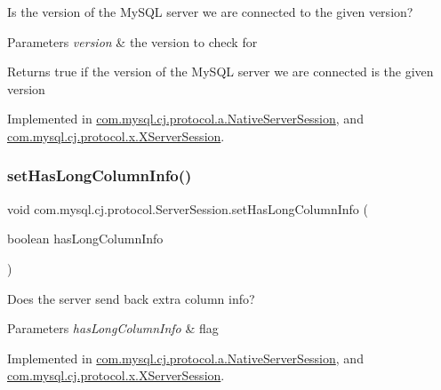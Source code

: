 Is the version of the My\+S\+QL server we are connected to the given version?


\begin{DoxyParams}{Parameters}
{\em version} & the version to check for\\
\hline
\end{DoxyParams}
\begin{DoxyReturn}{Returns}
true if the version of the My\+S\+QL server we are connected is the given version 
\end{DoxyReturn}


Implemented in \mbox{\hyperlink{classcom_1_1mysql_1_1cj_1_1protocol_1_1a_1_1_native_server_session_a07301eeaa6402981ce961f528b4e09ef}{com.\+mysql.\+cj.\+protocol.\+a.\+Native\+Server\+Session}}, and \mbox{\hyperlink{classcom_1_1mysql_1_1cj_1_1protocol_1_1x_1_1_x_server_session_aa121370ff7a1579fd5d7f4d653594f49}{com.\+mysql.\+cj.\+protocol.\+x.\+X\+Server\+Session}}.

\mbox{\label{interfacecom_1_1mysql_1_1cj_1_1protocol_1_1_server_session_a004d9939fa7471ce08e0b404363642fc}} 
\subsubsection{\texorpdfstring{set\+Has\+Long\+Column\+Info()}{setHasLongColumnInfo()}}
{\footnotesize\ttfamily void com.\+mysql.\+cj.\+protocol.\+Server\+Session.\+set\+Has\+Long\+Column\+Info (\begin{DoxyParamCaption}\item[{boolean}]{has\+Long\+Column\+Info }\end{DoxyParamCaption})}

Does the server send back extra column info?


\begin{DoxyParams}{Parameters}
{\em has\+Long\+Column\+Info} & flag \\
\hline
\end{DoxyParams}


Implemented in \mbox{\hyperlink{classcom_1_1mysql_1_1cj_1_1protocol_1_1a_1_1_native_server_session_ab7e6639fd06a4d47ab35e3cd89dfc10a}{com.\+mysql.\+cj.\+protocol.\+a.\+Native\+Server\+Session}}, and \mbox{\hyperlink{classcom_1_1mysql_1_1cj_1_1protocol_1_1x_1_1_x_server_session_a3a9514d67c9914f156534c2a3e53b35a}{com.\+mysql.\+cj.\+protocol.\+x.\+X\+Server\+Session}}.

